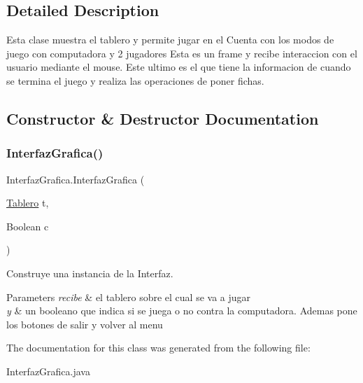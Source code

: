 \subsection{Detailed Description}
Esta clase muestra el tablero y permite jugar en el Cuenta con los modos de juego con computadora y 2 jugadores Esta es un frame y recibe interaccion con el usuario mediante el mouse. Este ultimo es el que tiene la informacion de cuando se termina el juego y realiza las operaciones de poner fichas. 

\subsection{Constructor \& Destructor Documentation}
\mbox{\label{class_interfaz_grafica_a3ab695965d5886c0257148cab68974d9}} 
\subsubsection{\texorpdfstring{Interfaz\+Grafica()}{InterfazGrafica()}}
{\footnotesize\ttfamily Interfaz\+Grafica.\+Interfaz\+Grafica (\begin{DoxyParamCaption}\item[{\mbox{\hyperlink{class_tablero}{Tablero}}}]{t,  }\item[{Boolean}]{c }\end{DoxyParamCaption})}



Construye una instancia de la Interfaz. 


\begin{DoxyParams}{Parameters}
{\em recibe} & el tablero sobre el cual se va a jugar \\
\hline
{\em y} & un booleano que indica si se juega o no contra la computadora. Ademas pone los botones de salir y volver al menu \\
\hline
\end{DoxyParams}


The documentation for this class was generated from the following file\+:\begin{DoxyCompactItemize}
\item 
Interfaz\+Grafica.\+java\end{DoxyCompactItemize}
